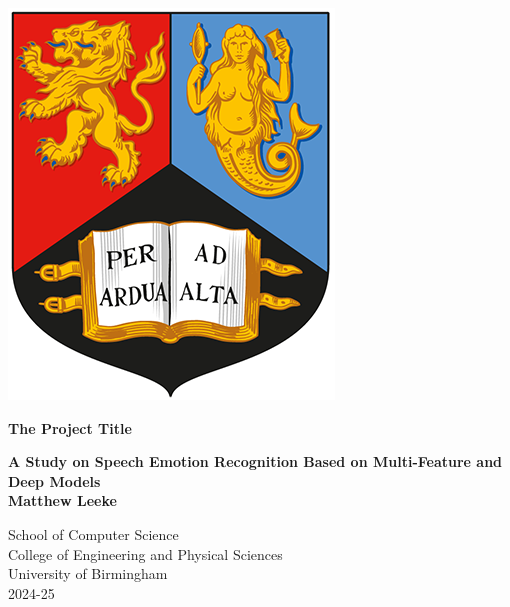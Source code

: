 
\thispagestyle{empty}

\begin{spacing}{2}
	\begin{center}
		\includegraphics[scale = 1.5]{Preamble/BirmCrest.png}
	\end{center}
	\vspace{10mm}
	\begin{center}
		\textbf{\Large The Project Title}
		\vspace{10mm}
	\end{center}
	\begin{center}
		\textbf{\large A Study on Speech Emotion Recognition Based on Multi-Feature and Deep Models}
		\vspace{20mm}
		\\\textbf{\Large Matthew Leeke}
		\vspace{30mm}
	\end{center}
	\begin{center}
		{\large School of Computer Science}
		\\ {\large College of Engineering and Physical Sciences}
		\\ {\large University of Birmingham}
		\\ {\large 2024-25}
	\end{center}
\end{spacing}


